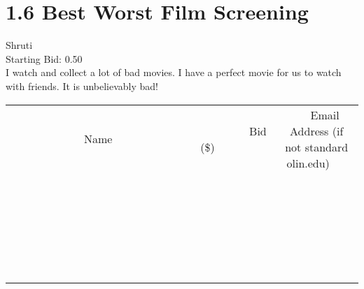 \documentclass[11pt]{article}
\begin{document}
					\section*{1.6 Best Worst Film Screening}
					Shruti \\
					Starting Bid: 0.50 \\
					I watch and collect a lot of bad movies. I have a perfect movie for us to watch with friends. It is unbelievably bad! \\
					[6ex]
					\begin{tabular}{c c c}
						~~~~~~~~~~~~~Name~~~~~~~~~~~~~ & ~~~~~~~~~Bid (\$)~~~~~~~~~ & ~~~Email Address (if not standard olin.edu)~~~ \\
				
 & & \\
\hline
 & & \\
\hline
 & & \\
\hline
 & & \\
\hline
 & & \\
\hline
 & & \\
\hline
 & & \\
\hline
 & & \\
\hline
 & & \\
\hline
 & & \\
\hline
 & & \\
\hline
 & & \\
\hline
 & & \\
\hline
 & & \\
\hline
 & & \\
\hline
 & & \\
\hline
 & & \\
\hline
 & & \\
\hline
 & & \\
\hline
 & & \\
\hline
 & & \\
\hline
 & & \\
\hline
 & & \\
\hline
 & & \\
\hline
 & & \\
\hline
 & & \\
\hline
					\end{tabular}
					\clearpage
				
\end{document}
